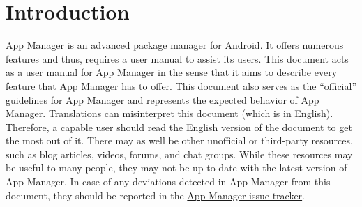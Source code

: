 \chapter{Introduction}\label{ch:introduction} %
App Manager is an advanced package manager for Android. It offers numerous features and thus, requires a user
manual to assist its users. This document acts as a user manual for App Manager in the sense that it aims to describe
every feature that App Manager has to offer. This document also serves as the ``official'' guidelines for
App Manager and represents the expected behavior of App Manager. Translations can misinterpret this document (which is
in English). Therefore, a capable user should read the English version of the document to get the most out
of it. There may as well be other unofficial or third-party resources, such as blog articles, videos, forums, and chat
groups. While these resources may be useful to many people, they may not be up-to-date with the latest
version of App Manager. In case of any deviations detected in App Manager from this document, they should be reported in the
\href{https://github.com/MuntashirAkon/AppManager/issues}{App Manager issue tracker}.


